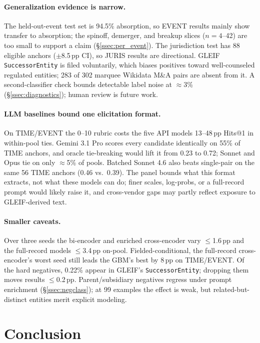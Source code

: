 \documentclass[sigconf]{acmart}
\begin{document}
\paragraph{Generalization evidence is narrow.} The held-out-event
test set is 94.5\% absorption, so EVENT results mainly show
transfer to absorption; the spinoff, demerger, and breakup slices
($n{=}4$--42) are too small to support a claim
(\S\ref{ssec:per_event}).
The jurisdiction test has 88 eligible anchors ($\pm$8.5\,pp CI), so
JURIS results are directional. GLEIF \texttt{SuccessorEntity} is
filed voluntarily, which biases positives toward well-counseled
regulated entities; 283 of 302 marquee Wikidata M\&A pairs are
absent from it. A second-classifier check bounds detectable label
noise at $\approx$3\% (\S\ref{ssec:diagnostics}); human review is
future work.

\paragraph{LLM baselines bound one elicitation format.} On
TIME/EVENT the 0--10 rubric costs the five API models 13--48\,pp
Hits@1 in within-pool ties. Gemini 3.1 Pro scores every candidate
identically on 55\% of TIME anchors, and oracle tie-breaking would
lift it from 0.23 to 0.72; Sonnet and Opus tie on only
$\approx$5\% of pools. Batched Sonnet 4.6 also beats single-pair
on the same 56 TIME anchors (0.46 vs.\ 0.39). The panel bounds what
this format extracts, not what these models can do; finer scales,
log-probs, or a full-record prompt would likely raise it, and
cross-vendor gaps may partly reflect exposure to GLEIF-derived text.

\paragraph{Smaller caveats.} Over three seeds the bi-encoder and
enriched cross-encoder vary $\leq$1.6\,pp and the full-record models
$\leq$3.4\,pp on-pool. Fielded-conditional, the full-record
cross-encoder's worst seed still leads the GBM's best by 8\,pp on
TIME/EVENT. Of
the hard negatives, 0.22\% appear in GLEIF's
\texttt{SuccessorEntity}; dropping them moves results
$\leq$0.2\,pp. Parent/subsidiary negatives regress under prompt
enrichment (\S\ref{ssec:negclass}); at 99 examples the effect is
weak, but related-but-distinct entities merit explicit modeling.

\section{Conclusion}
\end{document}
